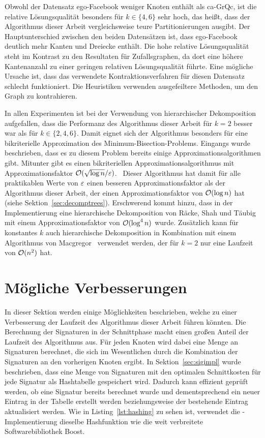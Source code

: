 Obwohl der Datensatz ego-Facebook weniger Knoten enthält als ca-GrQc, ist die relative Lösungsqualität besonders für $k \in \{4,6\}$ sehr hoch, das heißt, dass der Algorithmus dieser Arbeit vergleichsweise teure Partitionierungen ausgibt.
Der Hauptunterschied zwischen den beiden Datensätzen ist, dass ego-Facebook deutlich mehr Kanten und Dreiecke enthält.
Die hohe relative Lösungsqualität steht im Kontrast zu den Resultaten für Zufallsgraphen, da dort eine höhere Kantenanzahl zu einer geringen relativen Lösungsqualität führte.
Eine mögliche Ursache ist, dass das verwendete Kontraktionsverfahren für diesen Datensatz schlecht funktioniert.
Die Heuristiken verwenden ausgefeiltere Methoden, um den Graph zu kontrahieren.

In allen Experimenten ist bei der Verwendung von hierarchischer Dekomposition aufgefallen, dass die Performanz des Algorithmus dieser Arbeit für $k=2$ besser war als für $k \in \{2, 4, 6\}$.
Damit eignet sich der Algorithmus besonders für eine bikriterielle Approximation des Minimum-Bisection-Problems.
Eingangs wurde beschrieben, dass es zu diesem Problem bereits einige Approximationsalgorithmen gibt.
Mitunter gibt es einen bikriteriellen Approximationsalgorithmus mit Approximationsfaktor $\mathcal{O}(\sqrt{\log n}/\varepsilon)$.~\cite{LR99, ARV09}
Dieser Algorithmus hat damit für alle praktikablen Werte von $\varepsilon$ einen besseren Approximationsfaktor als der Algorithmus dieser Arbeit, der einen Approximationsfaktor von $\mathcal{O}(\log n)$ hat (siehe Sektion~\ref{sec:decomptrees}).
Erschwerend kommt hinzu, dass in der Implementierung eine hierarchische Dekomposition von Räcke, Shah und Täubig~\cite{RST14} mit einem Approximationsfaktor von $\mathcal{O}(\log^4 n)$ wurde. 
Zusätzlich kann für konstantes $k$ auch hierarchische Dekomposition in Kombination mit einem Algorithmus von Macgregor~\cite{mcg78} verwendet werden, der für $k=2$ nur eine Laufzeit von $\mathcal{O}(n^2)$ hat.

\section{Mögliche Verbesserungen}\label{sec:improv}
In dieser Sektion werden einige Möglichkeiten beschrieben, welche zu einer Verbesserung der Laufzeit des Algorithmus dieser Arbeit führen könnten.
Die Berechnung der Signaturen in der Schnittphase macht einen großen Anteil der Laufzeit des Algorithmus aus.
Für jeden Knoten wird dabei eine Menge an Signaturen berechnet, die sich im Wesentlichen durch die Kombination der Signaturen an den vorherigen Knoten ergibt.
In Sektion~\ref{sec:sigimpl} wurde beschrieben, dass eine Menge von Signaturen mit den optimalen Schnittkosten für jede Signatur als Hashtabelle gespeichert wird.
Dadurch kann effizient geprüft werden, ob eine Signatur bereits berechnet wurde und dementsprechend ein neuer Eintrag in der Tabelle erstellt werden beziehungsweise der bestehende Eintrag aktualisiert werden.
Wie in Listing~\ref{lst:hashing} zu sehen ist, verwendet die \Cpp{}\hyp Implementierung dieselbe Hashfunktion wie die weit verbreitete Softwarebibliothek Boost.

